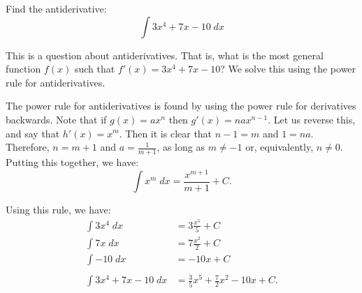 \documentclass{ximera}
\author{Emma Smith Zbarsky}
\begin{document}
\begin{exercise}

Find the antiderivative: \[\int 3x^4+7x-10\; dx\]


\begin{hint}
This is a question about antiderivatives. That is, what is the most
general function $f(x)$ such that $f'(x) = 3x^4+7x-10$? We solve this
using the power rule for antiderivatives.
\end{hint}


\begin{hint}
The power rule for antiderivatives is found by using the power rule for
derivatives backwards. Note that if $g(x) = ax^n$ then
$g'(x) = nax^{n-1}$. Let us reverse this, and say that $h'(x) = x^m$.
Then it is clear that $n-1 = m$ and $1=na$. Therefore, $n= m+1$ and
$a = \frac{1}{m+1}$, as long as $m\neq -1$ or, equivalently, $n\neq 0$.
Putting this together, we have:
\[\int x^m\; dx = \frac{x^{m+1}}{m+1} + C.\]

Using this rule, we have: \begin{align*}
\int 3x^4 \; dx &= 3\frac{x^5}{5} + C \\
\int 7x \; dx &= 7 \frac{x^2}{2} + C \\
\int -10 \; dx &= -10x + C \\
& \\
\int 3x^4+7x-10\; dx &= \frac{3}{5}x^5 + \frac{7}{2}x^2 -10x + C.
\end{align*}
\end{hint}


\begin{multipleChoice}
\end{multipleChoice}

\end{exercise}
\end{document}
